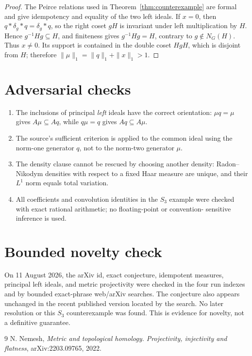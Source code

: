 \documentclass[11pt]{article}
\begin{document}
\begin{proof}
The Peirce relations used in Theorem~\ref{thm:counterexample} are formal and
give idempotency and equality of the two left ideals.  If $x=0$, then
$q*\delta_g*q=\delta_g*q$, so the right coset $gH$ is invariant under left
multiplication by $H$.  Hence $g^{-1}Hg\subseteq H$, and finiteness gives
$g^{-1}Hg=H$, contrary to $g\notin N_G(H)$.  Thus $x\ne0$.  Its support is
contained in the double coset $HgH$, which is disjoint from $H$; therefore
$\|\mu\|_1=\|q\|_1+\|x\|_1>1$.
\end{proof}

\section*{Adversarial checks}
\begin{enumerate}[leftmargin=2em]
\item The inclusions of principal \emph{left} ideals have the correct
orientation: $\mu q=\mu$ gives $A\mu\subseteq Aq$, while $q\mu=q$ gives
$Aq\subseteq A\mu$.
\item The source's sufficient criterion is applied to the common ideal using
the norm-one generator $q$, not to the norm-two generator $\mu$.
\item The density clause cannot be rescued by choosing another density:
Radon--Nikodym densities with respect to a fixed Haar measure are unique, and
their $L^1$ norm equals total variation.
\item All coefficients and convolution identities in the $S_3$ example were
checked with exact rational arithmetic; no floating-point or convention-
sensitive inference is used.
\end{enumerate}

\section*{Bounded novelty check}
On 11 August 2026, the arXiv id, exact conjecture, idempotent measures,
principal left ideals, and metric projectivity were checked in the four run
indexes and by bounded exact-phrase web/arXiv searches.  The conjecture also
appears unchanged in the recent published version located by the search.  No
later resolution or this $S_3$ counterexample was found.  This is evidence for
novelty, not a definitive guarantee.

\begin{thebibliography}{9}
N. Nemesh,
\emph{Metric and topological homology. Projectivity, injectivity and flatness},
arXiv:2203.09765, 2022.
\end{thebibliography}
\end{document}

